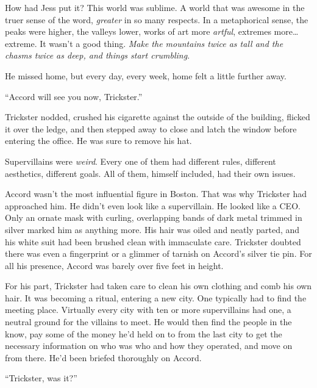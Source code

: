 How had Jess put it?  This world was sublime.  A world that was awesome in the truer sense of the word, \emph{greater} in so many respects.  In a metaphorical sense, the peaks were higher, the valleys lower, works of art more \emph{artful}, extremes more\ldots extreme.  It wasn't a good thing.  \emph{Make the mountains twice as tall and the chasms twice as deep, and things start crumbling}.



He missed home, but every day, every week, home felt a little further away.



``Accord will see you now, Trickster.''



Trickster nodded, crushed his cigarette against the outside of the building, flicked it over the ledge, and then stepped away to close and latch the window before entering the office. He was sure to remove his hat.



Supervillains were \emph{weird}.  Every one of them had different rules, different aesthetics, different goals.  All of them, himself included, had their own issues.



Accord wasn't the most influential figure in Boston.  That was why Trickster had approached him.  He didn't even look like a supervillain.  He looked like a CEO.  Only an ornate mask with curling, overlapping bands of dark metal trimmed in silver marked him as anything more.  His hair was oiled and neatly parted, and his white suit had been brushed clean with immaculate care.  Trickster doubted there was even a fingerprint or a glimmer of tarnish on Accord's silver tie pin.  For all his presence, Accord was barely over five feet in height.



For his part, Trickster had taken care to clean his own clothing and comb his own hair.  It was becoming a ritual, entering a new city.  One typically had to find the meeting place.  Virtually every city with ten or more supervillains had one, a neutral ground for the villains to meet.  He would then find the people in the know, pay some of the money he'd held on to from the last city to get the necessary information on who was who and how they operated, and move on from there.  He'd been briefed thoroughly on Accord.



``Trickster, was it?''



